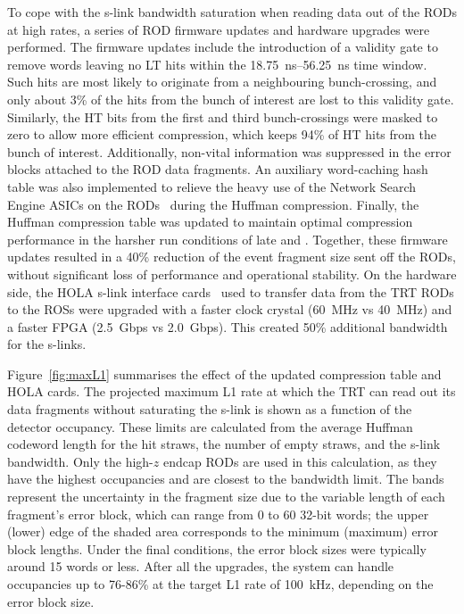 \documentclass[cernpreprint, atlasdraft=false, UKenglish,british,orcidlogo, texmf, orcidlogo]{atlasdoc}
\begin{document}
To cope with the \gls{s-link} bandwidth saturation when reading data out of the \glspl{ROD} at high rates, a series of \gls{ROD} firmware updates and hardware upgrades were performed. The firmware updates include the introduction of a validity gate to remove words leaving no \gls{LT} hits within the \SIrange{18.75}{56.25}{\nano\second} time window.
Such hits are most likely to originate from a neighbouring bunch-crossing, and
only about 3\% of the hits from the bunch of interest are lost to this validity gate.
Similarly, the \gls{HT} bits from the first and third bunch-crossings were masked to zero to allow more efficient compression, which keeps 94\% of \gls{HT} hits from the bunch of interest.
Additionally, non-vital information was suppressed in the error blocks attached to the \gls{ROD} data fragments.
An auxiliary word-caching hash table was also implemented to relieve the heavy use of the Network Search Engine \glspl{ASIC} on the \glspl{ROD}~\cite{TRTElectronics} during the Huffman compression.
Finally, the Huffman compression table was updated to maintain optimal compression performance in the harsher run conditions of late \RunTwo and \RunThr.
Together, these firmware updates resulted in a 40\% reduction of the event fragment size sent off the \glspl{ROD}, without significant loss of performance and operational stability.
On the hardware side, the \gls{HOLA} \gls{s-link} interface cards~\cite{HOLA} used to transfer data from the \gls{TRT} \glspl{ROD} to the \glspl{ROS} were upgraded with a faster clock crystal (\SI{60}{\MHz} vs \SI{40}{\MHz}) and a faster \gls{FPGA} (\SI{2.5}{Gbps} vs \SI{2.0}{Gbps}).
This created 50\% additional bandwidth for the \glspl{s-link}.
 
Figure~\ref{fig:maxL1} summarises the effect of the updated compression table and \gls{HOLA} cards.
The projected maximum \gls{L1} rate at which the \gls{TRT} can read out its data fragments without saturating the \gls{s-link} is shown as a function of the detector occupancy.
These limits are calculated from the average Huffman codeword length for the hit straws, the number of empty straws, and the \gls{s-link} bandwidth.
Only the high-$z$ endcap \glspl{ROD} are used in this calculation, as they have the highest occupancies and are closest to the bandwidth limit.
The bands represent the uncertainty in the fragment size due to the variable length of each fragment's error block, which can range from 0 to 60 32-bit words; the upper (lower) edge of the shaded area corresponds to the minimum (maximum) error block lengths.
Under the final \RunTwo conditions, the error block sizes were typically around 15 words or less.
After all the upgrades, the system can handle occupancies up to 76-86\% at the target \gls{L1} rate of \SI{100}{\kHz}, depending on the error block size.
 
\end{document}

